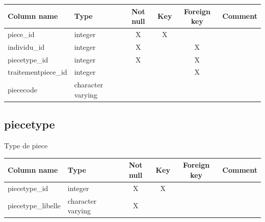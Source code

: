 \begin{tabular}{|l| p{2cm}|c|c|c| p{3cm}|}
\hline
Column name & Type & Not null & Key & Foreign key & Comment \\
\hline
piece\_id & integer & X & X & & \\
\hline
individu\_id & integer & X & & X & \\
\hline
piecetype\_id & integer & X & & X & \\
\hline
traitementpiece\_id & integer & & & X & \\
\hline
piececode & character varying & & & & \\
\hline
\end{tabular}
\subsection{piecetype}
Type de piece

\begin{tabular}{|l| p{2cm}|c|c|c| p{3cm}|}
\hline
Column name & Type & Not null & Key & Foreign key & Comment \\
\hline
piecetype\_id & integer & X & X & & \\
\hline
piecetype\_libelle & character varying & X & & & \\
\hline
\end{tabular}
